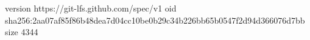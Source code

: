 version https://git-lfs.github.com/spec/v1
oid sha256:2aa07af85f86b48dea7d04cc10be0b29c34b226bb65b0547f2d94d366076d7bb
size 4344
